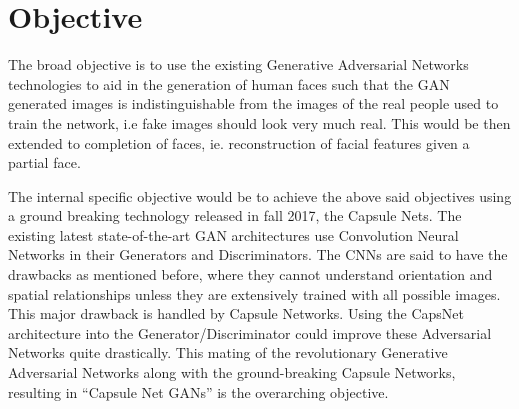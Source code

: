 \chapter{Objective}\label{ch:objective}
The broad objective is to use the existing Generative Adversarial Networks technologies to aid in the generation of human faces such that the GAN generated images is indistinguishable from the images of the real people used to train the network, i.e fake images should look very much real. This would be then extended to completion of faces, ie. reconstruction of facial features given a partial face.\par\bigskip
The internal specific objective would be to achieve the above said objectives using a ground breaking technology released in fall 2017, the Capsule Nets. The existing latest state-of-the-art GAN architectures use Convolution Neural Networks in their Generators and Discriminators. The CNNs are said to have the drawbacks as mentioned before, where they cannot understand orientation and spatial relationships unless they are extensively trained with all possible images. This major drawback is handled by Capsule Networks.
Using the CapsNet architecture into the Generator/Discriminator could improve these Adversarial Networks quite drastically. This mating of the revolutionary Generative Adversarial Networks along with the ground-breaking Capsule Networks, resulting in “Capsule Net GANs” is the overarching objective.
